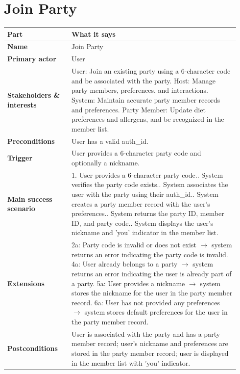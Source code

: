 \documentclass[11pt,twocolumn]{article}
\newcommand{\ucheader}{%
\textbf{Part} & \textbf{What it says} \\
\hline
\endhead
\hline
\endfoot
}
\begin{document}
\section{Join Party}
{\footnotesize
\begin{longtable}{@{}p{0.26\linewidth}p{0.68\linewidth}@{}}
\hline
\ucheader
\textbf{Name} & Join Party \\
\hline
\textbf{Primary actor} & User \\
\hline
\textbf{Stakeholders \& interests} & User: Join an existing party using a 6-character code and be associated with the party. Host: Manage party members, preferences, and interactions. System: Maintain accurate party member records and preferences. Party Member: Update diet preferences and allergens, and be recognized in the member list. \\
\hline
\textbf{Preconditions} & User has a valid auth\_id. \\
\hline
\textbf{Trigger} & User provides a 6-character party code and optionally a nickname. \\
\hline
\textbf{Main success scenario} & 1. User provides a 6-character party code.\newline
2. System verifies the party code exists.\newline
3. System associates the user with the party using their auth\_id.\newline
4. System creates a party member record with the user's preferences.\newline
5. System returns the party ID, member ID, and party code.\newline
6. System displays the user's nickname and 'you' indicator in the member list. \\
\hline
\textbf{Extensions} & 2a: Party code is invalid or does not exist $\rightarrow$ system returns an error indicating the party code is invalid.\newline
4a: User already belongs to a party $\rightarrow$ system returns an error indicating the user is already part of a party.\newline
5a: User provides a nickname $\rightarrow$ system stores the nickname for the user in the party member record.\newline
6a: User has not provided any preferences $\rightarrow$ system stores default preferences for the user in the party member record. \\
\hline
\textbf{Postconditions} & User is associated with the party and has a party member record; user's nickname and preferences are stored in the party member record; user is displayed in the member list with 'you' indicator. \\
\hline
\end{longtable}
}
\end{document}
